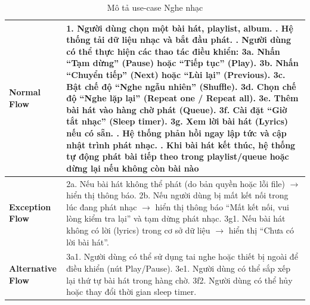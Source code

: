 \documentclass[a4paper]{article}
\newcommand{\cach}{\hspace*{1.5em}\ignorespaces}
\begin{document}
\begin{table}[H]
\begin{tabularx}{\textwidth}{|l|X|}
		\textbf{Normal Flow}
		                       & 1. Người dùng chọn một bài hát, playlist, album. \newline
		2. Hệ thống tải dữ liệu nhạc và bắt đầu phát. \newline
		3. Người dùng có thể thực hiện các thao tác điều khiển: \newline
		\cach 3a. Nhấn “Tạm dừng” (Pause) hoặc “Tiếp tục” (Play). \newline
		\cach 3b. Nhấn “Chuyển tiếp” (Next) hoặc “Lùi lại” (Previous). \newline
		\cach 3c. Bật chế độ “Nghe ngẫu nhiên” (Shuffle). \newline
		\cach 3d. Chọn chế độ “Nghe lặp lại” (Repeat one / Repeat all). \newline
		\cach 3e. Thêm bài hát vào hàng chờ phát (Queue). \newline
		\cach 3f. Cài đặt “Giờ tắt nhạc” (Sleep timer). \newline
		\cach 3g. Xem lời bài hát (Lyrics) nếu có sẵn. \newline
		4. Hệ thống phản hồi ngay lập tức và cập nhật trình phát nhạc. \newline
		5. Khi bài hát kết thúc, hệ thống tự động phát bài tiếp theo trong playlist/queue hoặc dừng lại nếu không còn bài nào                                                                                                                                                                                \\ \hline
		\textbf{Exception Flow}
		                       & 2a. Nếu bài hát không thể phát (do bản quyền hoặc lỗi file) $\rightarrow$  hiển thị thông báo. \newline
		2b. Nếu người dùng bị mất kết nối trong lúc đang phát nhạc $\rightarrow$ hiển thị thông báo “Mất kết nối, vui lòng kiểm tra lại” và tạm dừng phát nhạc. \newline
		3g1. Nếu bài hát không có lời (lyrics) trong cơ sở dữ liệu $\rightarrow$ hiển thị “Chưa có lời bài hát”.                                                                                                                                                                                             \\ \hline
		\textbf{Alternative Flow}
		                       & 3a1. Người dùng có thể sử dụng tai nghe hoặc thiết bị ngoài để điều khiển (nút Play/Pause). \newline
		3e1. Người dùng có thể sắp xếp lại thứ tự bài hát trong hàng chờ. \newline
		3f2. Người dùng có thể hủy hoặc thay đổi thời gian sleep timer.                                                                                                                                                                                                                                      \\ \hline
	\end{tabularx}
	\caption{Mô tả use-case Nghe nhạc}
\end{table}
\end{document}
